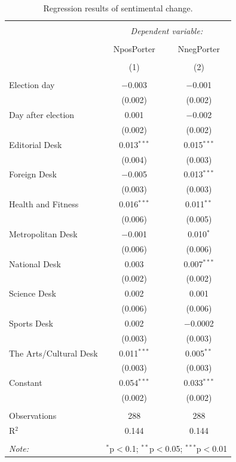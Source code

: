 \documentclass[12pt,letterpaper]{article}
\begin{document}
\begin{table}[H] \centering 
  \caption{Regression results of sentimental change.} 
  \label{} 
\begin{tabular}{@{\extracolsep{5pt}}lcc} 
\\[-1.8ex]\hline 
\hline \\[-1.8ex] 
 & \multicolumn{2}{c}{\textit{Dependent variable:}} \\ 
\cline{2-3} 
\\[-1.8ex] & NposPorter & NnegPorter \\ 
\\[-1.8ex] & (1) & (2)\\ 
\hline \\[-1.8ex] 
Election day & $-$0.003 & $-$0.001 \\ 
  & (0.002) & (0.002) \\ 
Day after election & 0.001 & $-$0.002 \\ 
  & (0.002) & (0.002) \\ 
 Editorial Desk & 0.013$^{***}$ & 0.015$^{***}$ \\ 
  & (0.004) & (0.003) \\ 
 Foreign Desk & $-$0.005 & 0.013$^{***}$ \\ 
  & (0.003) & (0.003) \\ 
 Health and Fitness & 0.016$^{***}$ & 0.011$^{**}$ \\ 
  & (0.006) & (0.005) \\ 
 Metropolitan Desk & $-$0.001 & 0.010$^{*}$ \\ 
  & (0.006) & (0.006) \\ 
 National Desk & 0.003 & 0.007$^{***}$ \\ 
  & (0.002) & (0.002) \\ 
 Science Desk & 0.002 & 0.001 \\ 
  & (0.006) & (0.006) \\ 
 Sports Desk & 0.002 & $-$0.0002 \\ 
  & (0.003) & (0.003) \\ 
 The Arts/Cultural Desk & 0.011$^{***}$ & 0.005$^{**}$ \\ 
  & (0.003) & (0.003) \\ 
 Constant & 0.054$^{***}$ & 0.033$^{***}$ \\ 
  & (0.002) & (0.002) \\ 
\hline \\[-1.8ex] 
Observations & 288 & 288 \\ 
R$^{2}$ & 0.144 & 0.144 \\ 
\hline 
\hline \\[-1.8ex] 
\textit{Note:}  & \multicolumn{2}{r}{$^{*}$p$<$0.1; $^{**}$p$<$0.05; $^{***}$p$<$0.01} \\ 
\end{tabular} 
\end{table} 
\end{document}
